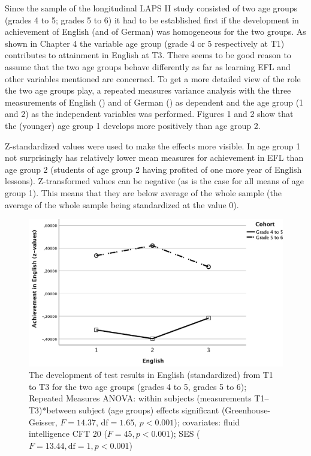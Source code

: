 \documentclass[output=paper]{langsci/langscibook}
\begin{document}
Since the sample of the longitudinal LAPS II study consisted of two age groups (grades 4 to 5; grades 5 to 6) it had to be established first if the development in achievement of English (and of German) was homogeneous for the two groups. As shown in Chapter 4 the variable age group (grade 4 or 5 respectively at T1) contributes to attainment in English at T3. There seems to be good reason to assume that the two age groups behave differently as far as learning EFL and other variables mentioned are concerned. To get a more detailed view of the role the two age groups play, a repeated measures variance analysis with the three measurements of English () and of German () as dependent and the age group (1 and 2) as the independent variables was performed. Figures 1 and 2 show that the (younger) age group 1 develops more positively than age group 2. 

Z-standardized values were used to make the effects more visible. In  age group 1 not surprisingly has relatively lower mean measures for achievement in EFL than age group 2 (students of age group 2 having profited of one more year of English lessons). Z-transformed values can be negative (as is the case for all means of age group 1). This means that they are below average of the whole sample (the average of the whole sample being standardized at the value 0). 

 \begin{figure}
\includegraphics[width=\textwidth]{figures/figure9.1.pdf}
\caption{The development of test results in English (standardized) from T1 to T3 for the two age groups (grades 4 to 5, grades 5 to 6); Repeated Measures ANOVA: within subjects (measurements T1–T3)*between subject (age groups) effects significant (Greenhouse-Geisser, $F=14.37$, $\text{df}=1.65$, $p<0.001$); covariates: fluid intelligence CFT 20 ($F=45, p<0.001$); SES ($F=13.44, \text{df}=1, p<0.001$)}
\end{figure}
\end{document}
